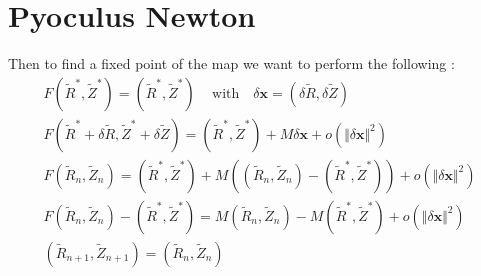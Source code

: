 \section{Pyoculus Newton}

Then to find a fixed point of the map we want to perform the following :
\begin{align*}
    F(\tilde{R}^*, \tilde{Z}^*) = (\tilde{R}^*, \tilde{Z}^*)\,\quad\text{with}\quad \delta\textbf{x}=(\delta \tilde{R}, \delta \tilde{Z})\\
    F(\tilde{R}^*+\delta \tilde{R}, \tilde{Z}^*+\delta \tilde{Z}) = (\tilde{R}^*, \tilde{Z}^*) + M\delta\textbf{x}+ o(\Vert \delta\textbf{x}\Vert^2)\\
    F(\tilde{R}_n,\tilde{Z}_n) = (\tilde{R}^*, \tilde{Z}^*) + M((\tilde{R}_n,\tilde{Z}_n) - (\tilde{R}^*, \tilde{Z}^*))+ o(\Vert \delta\textbf{x}\Vert^2)\\
    F(\tilde{R}_n,\tilde{Z}_n) - (\tilde{R}^*, \tilde{Z}^*)  = M(\tilde{R}_n,\tilde{Z}_n) - M(\tilde{R}^*, \tilde{Z}^*)+ o(\Vert \delta\textbf{x}\Vert^2)\\
    (\tilde{R}_{n+1},\tilde{Z}_{n+1}) = (\tilde{R}_n,\tilde{Z}_n)
\end{align*}


